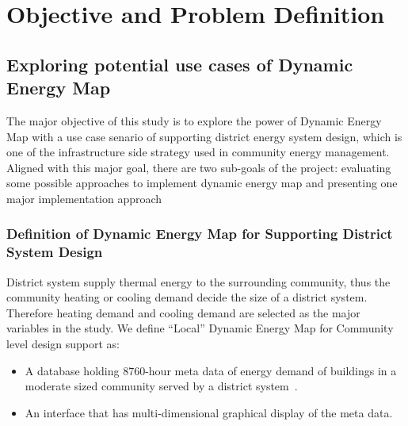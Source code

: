 \documentclass[hidelinks,12pt]{article}
\begin{document}
\section{Objective and Problem Definition}
\subsection{Exploring potential use cases of Dynamic Energy Map}
The major objective of this study is to explore the power of Dynamic
Energy Map with a use case senario of supporting district energy
system design, which is one of the infrastructure side strategy used
in community energy management. Aligned with this major goal, there
are two sub-goals of the project: evaluating some possible approaches
to implement dynamic energy map and presenting one major
implementation approach

\subsubsection{Definition of Dynamic Energy Map for Supporting
  District System Design}
District system supply thermal energy to the surrounding community,
thus the community heating or cooling demand decide the size of a
district system. Therefore heating demand and cooling demand are
selected as the major variables in the study. We define ``Local''
Dynamic Energy Map for Community level design support as:
\begin{itemize}
\item A database holding 8760-hour meta data of energy demand of
  buildings in a moderate sized community served by a district
  system~\cite{baird2014}.
\item An interface that has multi-dimensional graphical display of the
  meta data.
\end{itemize}
\end{document}
